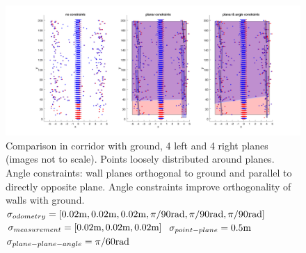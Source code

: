 \documentclass[a4paper,11pt]{article}
\begin{document}
\begin{figure}
\centering
\includegraphics[width=1.15\textwidth,trim={3cm 0 0 0},clip]{segmentedCorridorHighNoise.png}
\caption{\label{fig:segmentedCorridorHighNoise} Comparison in corridor with ground, 4 left and 4 right planes (images not to scale). Points loosely distributed around planes. Angle constraints: wall planes orthogonal to ground and parallel to directly opposite plane. Angle constraints improve orthogonality of walls with ground.\newline
$\sigma_{odometry} = [0.02\textnormal{m},0.02\textnormal{m},0.02\textnormal{m},
\pi/90\textnormal{rad},\pi/90\textnormal{rad},\pi/90\textnormal{rad}]$\newline
$\sigma_{measurement} = [0.02\textnormal{m},0.02\textnormal{m},0.02\textnormal{m}]$\newline
$\sigma_{point-plane} = 0.5\textnormal{m}$\newline
$\sigma_{plane-plane-angle} = \pi/60\textnormal{rad}$}
\end{figure}
\end{document}
